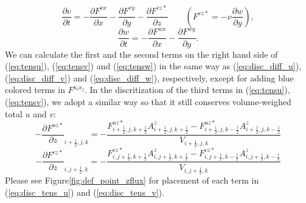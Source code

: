 \documentclass[9pt]{jsarticle}
\begin{document}
\vspace{-5pt}
\begin{equation}
  \frac{\partial v}{\partial t} = -\frac{\partial F^{vx}}{\partial x} - \frac{\partial F^{vy}}{\partial y} -\frac{\partial F^{vz*}}{\partial z}
  \quad \quad \left( F^{vz*} = -\nu \frac{\partial w}{\partial y}  \right),
  \label{eq:tensv}
\end{equation}
\vspace{-5pt}
\begin{equation}
  \frac{\partial w}{\partial t} = -\frac{\partial F^{wx}}{\partial x} - \frac{\partial F^{wy}}{\partial y}.
  \label{eq:tensw}
\end{equation}
We can calculate the first and the second terms on the right hand side of (\ref{eq:tensu}), (\ref{eq:tensv}) and (\ref{eq:tensw}) in the same way as (\ref{eq:disc_diff_u}), (\ref{eq:disc_diff_v}) and (\ref{eq:disc_diff_w}), respectively, except for adding blue colored terms in $F^{u_i x_j}$.
In the discritization of the third terms in (\ref{eq:tensu}), (\ref{eq:tensv}), we adopt a similar way so that it still conserves volume-weighed total $u$ and $v$:
\vspace{-5pt}
\begin{equation}
  -\frac{\partial F^{uz*}}{\partial z}_{i+\frac{1}{2},j,k} =
  -\frac{ F^{uz*}_{i+\frac{1}{2},j,k+\frac{1}{2}} A^z_{i+\frac{1}{2},j,k+\frac{1}{2}} - F^{uz*}_{i+\frac{1}{2},j,k-\frac{1}{2}} A^z_{i+\frac{1}{2},j,k-\frac{1}{2}} }{ V_{i+\frac{1}{2},j,k} }
  \label{eq:disc_tens_u}
\end{equation}
\vspace{-5pt}
\begin{equation}
  -\frac{\partial F^{vz*}}{\partial z}_{i,j+\frac{1}{2},k} =
  -\frac{ F^{vz*}_{i,j+\frac{1}{2},k+\frac{1}{2}} A^z_{i,j+\frac{1}{2},k+\frac{1}{2}} - F^{vz*}_{i,j+\frac{1}{2},k-\frac{1}{2}} A^z_{i,j+\frac{1}{2},k-\frac{1}{2}} }{ V_{i,j+\frac{1}{2},k} }
  \label{eq:disc_tens_v}
\end{equation}
Please see Figure\ref{fig:def_point_zflux} for placement of each term in (\ref{eq:disc_tens_u}) and (\ref{eq:disc_tens_v}).
\end{document}
